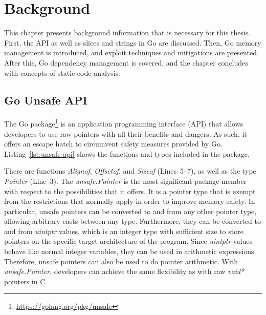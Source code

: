 
\chapter{Background}\label{ch:background}

This chapter presents background information that is necessary for this thesis.
First, the \unsafe{} \acrshort{API} as well as slices and strings in Go are discussed.
Then, Go memory management is introduced, and exploit techniques and mitigations are presented.
After this, Go dependency management is covered, and the chapter concludes with concepts of static code analysis.



\section{Go Unsafe API}\label{sec:background:unsafe-api}

The Go \unsafe{} package\footnote{\url{https://golang.org/pkg/unsafe}} is an application programming interface
(\acrshort{API}) that allows developers to use raw pointers with all their benefits and dangers.
As such, it offers an escape hatch to circumvent safety measures provided by Go.
Listing~\ref{lst:unsafe-api} shows the functions and types included in the \unsafe{} package.



There are  functions \textit{Alignof}, \textit{Offsetof}, and \textit{Sizeof} (Lines~5--7),
as well as the type \textit{Pointer} (Line~3).
The \textit{unsafe.Pointer} is the most significant package member with respect to the possibilities that it offers.
It is a pointer type that is exempt from the restrictions that normally apply in order to improve memory safety.
In particular, unsafe pointers can be converted to and from any other pointer type, allowing arbitrary casts between
any type.
Furthermore, they can be converted to and from \textit{uintptr} values, which is an integer type with sufficient size
to store pointers on the specific target architecture of the program.
Since \textit{uintptr} values behave like normal integer variables, they can be used in arithmetic expressions.
Therefore, unsafe pointers can also be used to do pointer arithmetic.
With \textit{unsafe.Pointer}, developers can achieve the same flexibility as with raw \textit{void*} pointers in C.

